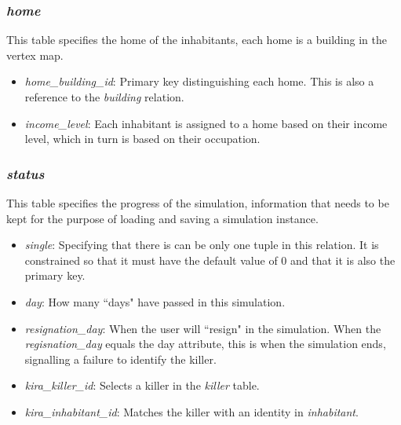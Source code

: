 \documentclass{article}
\begin{document}
\subsubsection{\textit{home}}
This table specifies the home of the inhabitants, each home is a building in the vertex map.

\begin{itemize}
    \item \textit{home\_building\_id}: Primary key distinguishing each home. This is also a reference to the \textit{building} relation.
    \item \textit{income\_level}: Each inhabitant is assigned to a home based on their income level, which in turn is based on their occupation.
\end{itemize}

\subsubsection{\textit{status}}
This table specifies the progress of the simulation, information that needs to be kept for the purpose of loading and saving a simulation instance.

\begin{itemize}
    \item \textit{single}: Specifying that there is can be only one tuple in this relation. It is constrained so that it must have the default value of 0 and that it is also the primary key.
    \item \textit{day}: How many ``days" have passed in this simulation.
    \item \textit{resignation\_day}: When the user will ``resign" in the simulation. When the \textit{regisnation\_day} equals the day attribute, this is when the simulation ends, signalling a failure to identify the killer.
    \item \textit{kira\_killer\_id}: Selects a killer in the \textit{killer} table.
    \item \textit{kira\_inhabitant\_id}: Matches the killer with an identity in \textit{inhabitant}.
\end{itemize}
\end{document}
